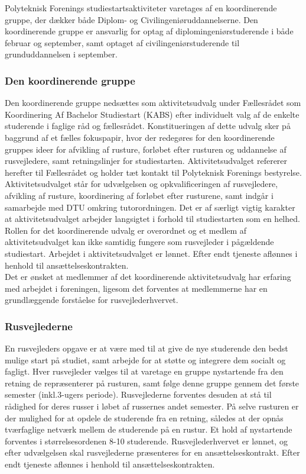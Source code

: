 Polyteknisk Forenings studiestartsaktiviteter varetages af en koordinerende gruppe, der dækker både Diplom- og Civilingeniøruddannelserne. Den koordinerende gruppe er ansvarlig for optag af diplomingeniørstuderende i både februar og september, samt optaget af civilingeniørstuderende til grunduddannelsen i september.

\subsubsection{Den koordinerende gruppe}
Den koordinerende gruppe nedsættes som aktivitetsudvalg under Fællesrådet som Koordinering Af Bachelor Studiestart (KABS) efter individuelt valg af de enkelte studerende i faglige råd og fællesrådet. Konstitueringen af dette udvalg sker på baggrund af et fælles fokuspapir, hvor der redegøres for den koordinerende gruppes ideer for afvikling af rusture, forløbet efter rusturen og uddannelse af rusvejledere, samt retningslinjer for studiestarten. Aktivitetsudvalget refererer herefter til Fællesrådet og holder tæt kontakt til Polyteknisk Forenings bestyrelse. Aktivitetsudvalget står for udvælgelsen og opkvalificeringen af rusvejledere, afvikling af rusture, koordinering af forløbet efter rusturene, samt indgår i samarbejde med DTU omkring tutorordningen. Det er af særligt vigtig karakter at aktivitetsudvalget arbejder langsigtet i forhold til studiestarten som en helhed. Rollen for det koordinerende udvalg er overordnet og et medlem af aktivitetsudvalget kan ikke samtidig fungere som rusvejleder i pågældende studiestart. Arbejdet i aktivitetsudvalget er lønnet. Efter endt tjeneste aflønnes i henhold til ansættelseskontrakten.\\

Det er ønsket at medlemmer af det koordinerende aktivitetsudvalg har erfaring med arbejdet i foreningen, ligesom det forventes at medlemmerne har en grundlæggende forståelse for rusvejlederhvervet.

\subsubsection{Rusvejlederne}
En rusvejleders opgave er at være med til at give de nye studerende den bedst mulige start på studiet, samt arbejde for at støtte og integrere dem socialt og fagligt. Hver rusvejleder vælges til at varetage en gruppe nystartende fra den retning de repræsenterer på rusturen, samt følge denne gruppe gennem det første semester (inkl.3-ugers periode). Rusvejlederne forventes desuden at stå til rådighed for deres russer i løbet af russernes andet semester. På selve rusturen er der mulighed for at opdele de studerende fra en retning, således at der opnås tværfaglige netværk mellem de studerende på en rustur. Et hold af nystartende forventes i størrelsesordenen 8-10 studerende. Rusvejlederhvervet er lønnet, og efter udvælgelsen skal rusvejlederne præsenteres for en ansættelseskontrakt. Efter endt tjeneste aflønnes i henhold til ansættelseskontrakten.


